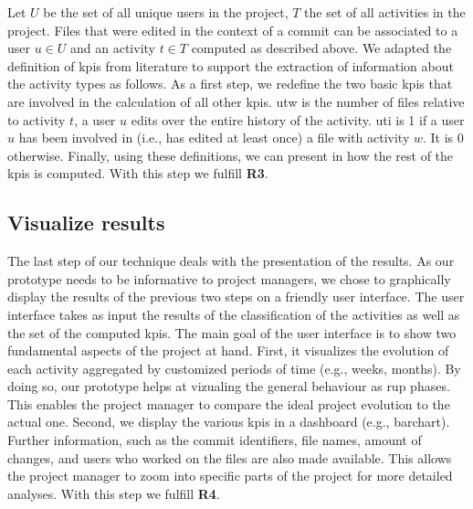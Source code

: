 Let $U$ be the set of all unique users in the project, $T$ the set of all activities in the project. Files that were edited in the context of a commit can be associated to a user $u \in U$ and an activity $t \in T$ computed as described above. 
We adapted the definition of \glspl{kpi} from literature to support the extraction of information about the activity types as follows. As a first step, we redefine the two basic \glspl{kpi} that are involved in the calculation of all other \glspl{kpi}. 
\gls{utw} is the number of files relative to activity $t$, a user $u$ edits over the entire history of the activity.
\gls{uti} is 1 if a user $u$ has been involved in (i.e., has edited at least once) a file with activity $w$. It is 0 otherwise. 
Finally, using these definitions, we can present in  how the rest of the \glspl{kpi} is computed. With this step we fulfill \textbf{R3}.\\\hfill



\subsection{Visualize results}
The last step of our technique deals with the presentation of the results. As our prototype needs to be informative to project managers, we chose to graphically display the results of the previous two steps on a friendly user interface. The user interface takes as input the results of the classification of the activities as well as the set of the computed \glspl{kpi}. 
The main goal of the user interface is to show two fundamental aspects of the project at hand. First, it visualizes the evolution of each activity aggregated by customized periods of time (e.g., weeks, months). By doing so, our prototype helps at vizualing the general behaviour as \gls{rup} phases. This enables the project manager to compare the ideal project evolution to the actual one. Second, we display the various \glspl{kpi} in a dashboard (e.g., barchart). Further information, such as the commit identifiers, file names, amount of changes, and users who worked on the files are also made available. This allows the project manager to zoom into specific parts of the project for more detailed analyses. With this step we fulfill \textbf{R4}.

